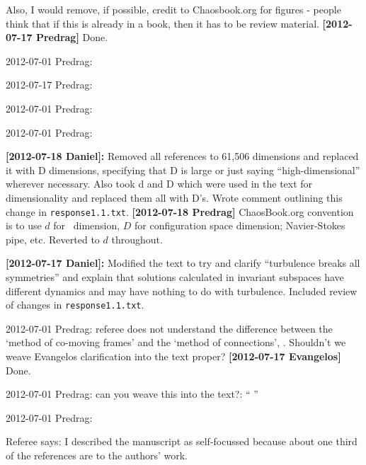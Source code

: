 \begin{description}
Also, I would remove, if possible, credit to Chaosbook.org for figures -
people think that if this is already in a book, then it has to be review
material.
 {\bf [2012-07-17 Predrag]} Done.


\item[(0)  x ] 2012-07-01 Predrag:

\item[(3) |?|] 2012-07-17 Predrag:

\item[(4) |?|] 2012-07-01 Predrag:

\item[(4) |x|] 2012-07-01 Predrag:

\item[minor (1) |x|] {\bf [2012-07-18 Daniel]:} Removed all references to
61,506 dimensions and replaced it with D dimensions, specifying that D is
large or just saying ``high-dimensional'' wherever necessary. Also took
d and D which were used in the text for dimensionality and replaced them
all with D's. Wrote comment outlining this change in \texttt{response1.1.txt}.
{\bf [2012-07-18 Predrag]}
ChaosBook.org convention is to use $d$ for \statesp\ dimension, $D$ for
configuration space dimension; Navier-Stokes pipe, etc. Reverted to $d$
throughout.

\item[minor (3) |x|] {\bf [2012-07-17 Daniel]:} Modified the text to try
and clarify ``turbulence breaks all symmetries'' and explain that
solutions calculated in invariant subspaces have different dynamics and
may have nothing to do with turbulence. Included review of changes in
\texttt{response1.1.txt}.

\item[minor 6. p9 |x|] 2012-07-01 Predrag:
 referee does not understand the difference between the `method of
 co-moving frames' and the `method of connections',
 . Shouldn't we weave Evangelos clarification
 into the text proper? {\bf [2012-07-17 Evangelos]} Done.

\item[minor (9) |?|] 2012-07-01 Predrag: can you weave this into the text?: ``
''

\item[minor (11) |?|] 2012-07-01 Predrag:


\item[2012-07-19 Evangelos] Referee says: I described the manuscript as self-focussed because about one third of
the references are to the authors' work.


\end{description}
